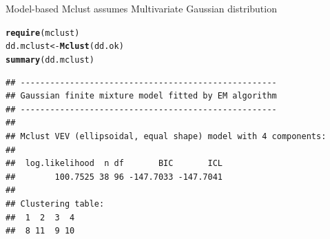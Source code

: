 \documentclass[10pt,xcolor=dvipsnames]{beamer}\usepackage[]{graphicx}\usepackage[]{color}
\makeatletter
\newcommand{\hlnum}[1]{\textcolor[rgb]{0.686,0.059,0.569}{#1}}%
\newcommand{\hlopt}[1]{\textcolor[rgb]{0,0,0}{#1}}%
\newcommand{\hlstd}[1]{\textcolor[rgb]{0.345,0.345,0.345}{#1}}%
\newcommand{\hlkwb}[1]{\textcolor[rgb]{0.69,0.353,0.396}{#1}}%
\newcommand{\hlkwc}[1]{\textcolor[rgb]{0.333,0.667,0.333}{#1}}%
\newcommand{\hlkwd}[1]{\textcolor[rgb]{0.737,0.353,0.396}{\textbf{#1}}}%
\newenvironment{kframe}{%
 \def\at@end@of@kframe{}%
 \ifinner\ifhmode%
  \def\at@end@of@kframe{\end{minipage}}%
  \begin{minipage}{\columnwidth}%
 \fi\fi%
 \def\FrameCommand##1{\hskip\@totalleftmargin \hskip-\fboxsep
 \colorbox{shadecolor}{##1}\hskip-\fboxsep
     \hskip-\linewidth \hskip-\@totalleftmargin \hskip\columnwidth}%
 \MakeFramed {\advance\hsize-\width
   \@totalleftmargin\z@ \linewidth\hsize
   \@setminipage}}%
 {\par\unskip\endMakeFramed%
 \at@end@of@kframe}
\newenvironment{knitrout}{}{} %
\makeatother
\begin{document}
\begin{frame}{Model-based}
Mclust assumes Multivariate Gaussian distribution
\begin{knitrout}\footnotesize
{}\color{fgcolor}\begin{kframe}
\begin{alltt}
\hlkwd{require}\hlstd{(mclust)}
\hlstd{dd.mclust} \hlkwb{<-} \hlkwd{Mclust}\hlstd{(dd.ok)}
\hlkwd{summary}\hlstd{(dd.mclust)}
\end{alltt}
\begin{verbatim}
## ----------------------------------------------------
## Gaussian finite mixture model fitted by EM algorithm 
## ----------------------------------------------------
## 
## Mclust VEV (ellipsoidal, equal shape) model with 4 components:
## 
##  log.likelihood  n df       BIC       ICL
##        100.7525 38 96 -147.7033 -147.7041
## 
## Clustering table:
##  1  2  3  4 
##  8 11  9 10
\end{verbatim}
\end{kframe}
\end{knitrout}
\end{frame}




\end{document}
